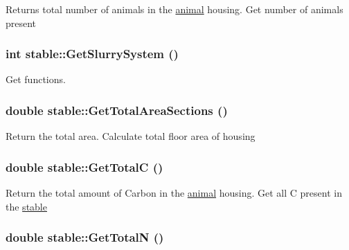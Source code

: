 Returns total number of animals in the \hyperlink{classanimal}{animal} housing. Get number of animals present \hypertarget{classstable_a478ddd9c5b91b0dcf03bbf08b2787b3a}{
\subsubsection[{GetSlurrySystem}]{\setlength{\rightskip}{0pt plus 5cm}int stable::GetSlurrySystem ()}}
\label{classstable_a478ddd9c5b91b0dcf03bbf08b2787b3a}


Get functions. \hypertarget{classstable_a8b0725c4f70fea2c3cb3c107bf8ed4f3}{
\subsubsection[{GetTotalAreaSections}]{\setlength{\rightskip}{0pt plus 5cm}double stable::GetTotalAreaSections ()}}
\label{classstable_a8b0725c4f70fea2c3cb3c107bf8ed4f3}


Return the total area. Calculate total floor area of housing \hypertarget{classstable_a9990239dddd0fd843bb0a7c25552292f}{
\subsubsection[{GetTotalC}]{\setlength{\rightskip}{0pt plus 5cm}double stable::GetTotalC ()}}
\label{classstable_a9990239dddd0fd843bb0a7c25552292f}


Return the total amount of Carbon in the \hyperlink{classanimal}{animal} housing. Get all C present in the \hyperlink{classstable}{stable} \hypertarget{classstable_aeba6a6b4fde4b262d38cedaec2f74348}{
\subsubsection[{GetTotalN}]{\setlength{\rightskip}{0pt plus 5cm}double stable::GetTotalN ()}}
\label{classstable_aeba6a6b4fde4b262d38cedaec2f74348}


